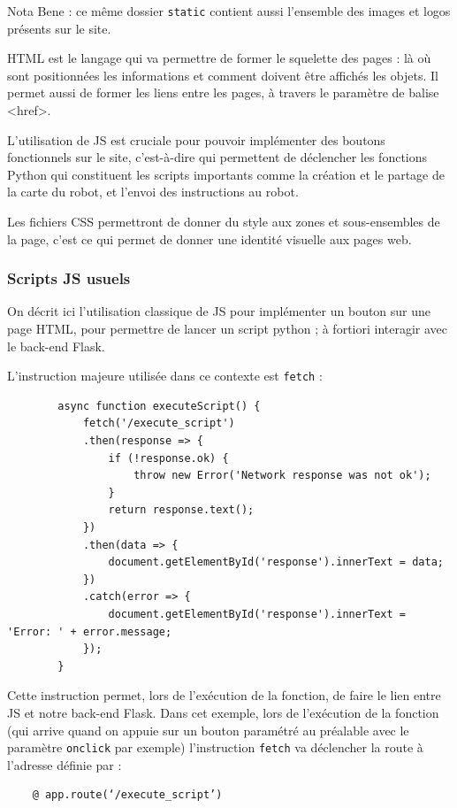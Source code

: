 \documentclass[a4paper,12pt]{report}  %
\begin{document}
Nota Bene : ce même dossier \texttt{static} contient aussi l’ensemble des images et logos présents sur le site.

HTML est le langage qui va permettre de former le squelette des pages : là où sont positionnées les informations et comment doivent être affichés les objets. Il permet aussi de former les liens entre les pages, à travers le paramètre de balise <href>. 

L’utilisation de JS est cruciale pour pouvoir implémenter des boutons fonctionnels sur le site, c'est-à-dire qui permettent de déclencher les fonctions Python qui constituent les scripts importants comme la création et le partage de la carte du robot, et l’envoi des instructions au robot. 

Les fichiers CSS permettront de donner du style aux zones et sous-ensembles de la page, c’est ce qui permet de donner une identité visuelle aux pages web. 

\subsubsection{Scripts JS usuels}

On décrit ici l’utilisation classique de JS pour implémenter un bouton sur une page HTML, pour permettre de lancer un script python ; à fortiori interagir avec le back-end Flask.

L’instruction majeure utilisée dans ce contexte est \texttt{fetch} : 
{\scriptsize
	\begin{lstlisting}
		async function executeScript() {
			fetch('/execute_script')
			.then(response => {
				if (!response.ok) {
					throw new Error('Network response was not ok');
				}
				return response.text();
			})
			.then(data => {
				document.getElementById('response').innerText = data;
			})
			.catch(error => {
				document.getElementById('response').innerText = 'Error: ' + error.message;
			});
		}
	\end{lstlisting}
}

Cette instruction permet, lors de l’exécution de la fonction, de faire le lien entre JS et notre back-end Flask. Dans cet exemple, lors de l’exécution de la fonction (qui arrive quand on appuie sur un bouton paramétré au préalable avec le paramètre \texttt{onclick} par exemple) l’instruction \texttt{fetch} va déclencher la route à l’adresse définie par :
\begin{lstlisting}
	@ app.route(‘/execute_script’)
\end{lstlisting}
\end{document}
